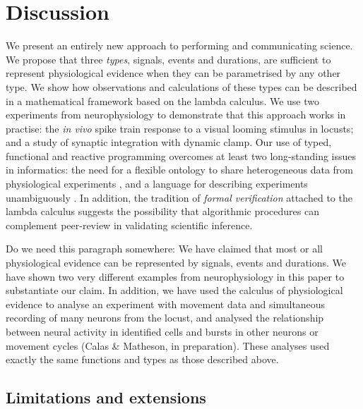 \section*{Discussion}

We present an entirely new approach to performing and communicating
science. We propose that three \emph{types}, signals, events and
durations, are sufficient to represent physiological evidence when
they can be parametrised by any other type. We show how observations
and calculations of these types can be described in a mathematical
framework based on the lambda calculus. We use two experiments from
neurophysiology to demonstrate that this approach works in practise:
the \emph{in vivo} spike train response to a visual looming stimulus
in locusts; and a study of synaptic integration with dynamic
clamp. Our use of typed, functional and reactive programming overcomes
at least two long-standing issues in informatics: the need for a
flexible ontology to share heterogeneous data from physiological
experiments \citep{Amari2002}, and a language for describing
experiments unambiguously \citep{Murray-Rust2002}. In addition, the
tradition of \emph{formal verification} attached to the lambda
calculus suggests the possibility that algorithmic procedures can
complement peer-review in validating scientific inference.

Do we need this paragraph somewhere: We have claimed that most or all
physiological evidence can be represented by signals, events and
durations. We have shown two very different examples from
neurophysiology in this paper to substantiate our claim. In addition,
we have used the calculus of physiological evidence to analyse an
experiment with movement data and simultaneous recording of many
neurons from the locust, and analysed the relationship between neural
activity in identified cells and bursts in other neurons or movement
cycles (Calas \& Matheson, in preparation). These analyses used
exactly the same functions and types as those described above.

\subsection*{Limitations and extensions}

